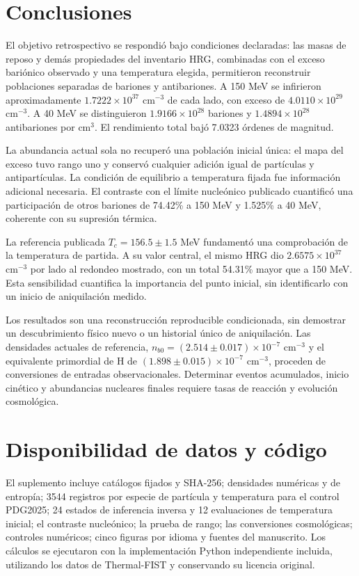 \section{Conclusiones}
El objetivo retrospectivo se respondió bajo condiciones declaradas: las masas de reposo y demás propiedades del inventario HRG, combinadas con el exceso bariónico observado y una temperatura elegida, permitieron reconstruir poblaciones separadas de bariones y antibariones. A 150 MeV se infirieron aproximadamente $1.7222\times10^{37}$ cm$^{-3}$ de cada lado, con exceso de $4.0110\times10^{29}$ cm$^{-3}$. A 40 MeV se distinguieron $1.9166\times10^{28}$ bariones y $1.4894\times10^{28}$ antibariones por cm$^3$. El rendimiento total bajó 7.0323 órdenes de magnitud.

La abundancia actual sola no recuperó una población inicial única: el mapa del exceso tuvo rango uno y conservó cualquier adición igual de partículas y antipartículas. La condición de equilibrio a temperatura fijada fue información adicional necesaria. El contraste con el límite nucleónico publicado cuantificó una participación de otros bariones de 74.42\% a 150 MeV y 1.525\% a 40 MeV, coherente con su supresión térmica.

La referencia publicada $T_c=156.5\pm1.5$ MeV fundamentó una comprobación de la temperatura de partida. A su valor central, el mismo HRG dio $2.6575\times10^{37}$ cm$^{-3}$ por lado al redondeo mostrado, con un total 54.31\% mayor que a 150 MeV. Esta sensibilidad cuantifica la importancia del punto inicial, sin identificarlo con un inicio de aniquilación medido.

Los resultados son una reconstrucción reproducible condicionada, sin demostrar un descubrimiento físico nuevo o un historial único de aniquilación. Las densidades actuales de referencia, $n_{b0}=(2.514\pm0.017)\times10^{-7}$ cm$^{-3}$ y el equivalente primordial de H de $(1.898\pm0.015)\times10^{-7}$ cm$^{-3}$, proceden de conversiones de entradas observacionales. Determinar eventos acumulados, inicio cinético y abundancias nucleares finales requiere tasas de reacción y evolución cosmológica.

\section*{Disponibilidad de datos y código}
El suplemento incluye catálogos fijados y SHA-256; densidades numéricas y de entropía; 3544 registros por especie de partícula y temperatura para el control PDG2025; 24 estados de inferencia inversa y 12 evaluaciones de temperatura inicial; el contraste nucleónico; la prueba de rango; las conversiones cosmológicas; controles numéricos; cinco figuras por idioma y fuentes del manuscrito. Los cálculos se ejecutaron con la implementación Python independiente incluida, utilizando los datos de Thermal-FIST y conservando su licencia original.


